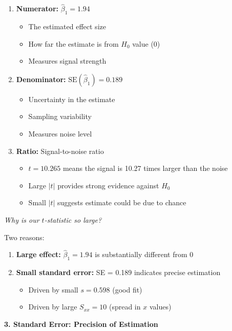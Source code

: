 \documentclass[12pt]{article}
\begin{document}
\begin{explanation}
\begin{enumerate}
    \item \textbf{Numerator:} $\hat{\beta}_1 = 1.94$
    \begin{itemize}
        \item The estimated effect size
        \item How far the estimate is from $H_0$ value (0)
        \item Measures signal strength
    \end{itemize}

    \item \textbf{Denominator:} $\text{SE}(\hat{\beta}_1) = 0.189$
    \begin{itemize}
        \item Uncertainty in the estimate
        \item Sampling variability
        \item Measures noise level
    \end{itemize}

    \item \textbf{Ratio:} Signal-to-noise ratio
    \begin{itemize}
        \item $t = 10.265$ means the signal is 10.27 times larger than the noise
        \item Large $|t|$ provides strong evidence against $H_0$
        \item Small $|t|$ suggests estimate could be due to chance
    \end{itemize}
\end{enumerate}

\textit{Why is our $t$-statistic so large?}

Two reasons:

\begin{enumerate}
    \item \textbf{Large effect:} $\hat{\beta}_1 = 1.94$ is substantially different from 0
    \item \textbf{Small standard error:} SE = 0.189 indicates precise estimation
    \begin{itemize}
        \item Driven by small $s = 0.598$ (good fit)
        \item Driven by large $S_{xx} = 10$ (spread in $x$ values)
    \end{itemize}
\end{enumerate}

\textbf{3. Standard Error: Precision of Estimation}


\end{explanation}
\end{document}
